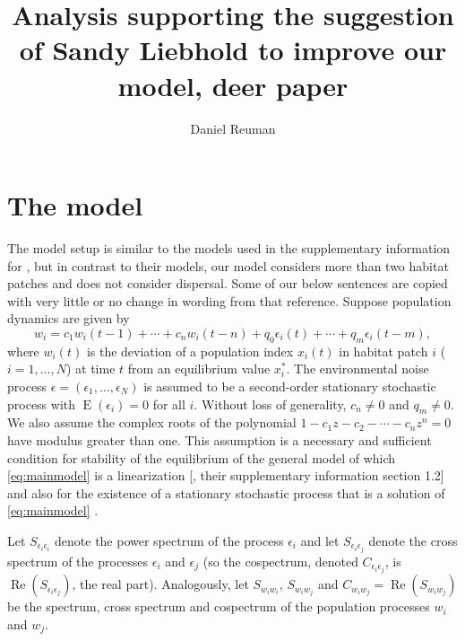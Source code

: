 \documentclass[letterpaper,11pt]{article}
\newcommand{\E}{{\operatorname{E}}}
\newcommand{\Rp}{{\operatorname{Re}}}
\begin{document}
\title{Analysis supporting the suggestion of Sandy Liebhold to improve our model, deer paper}
\author{Daniel Reuman}
\maketitle

\section{The model}\label{sec:model}

The model setup is similar to the models used in the supplementary information for 
\cite{Desharnais2018}, but in
contrast to their models, our model
considers more than two habitat patches and does not consider dispersal.
Some of our below sentences are copied with very little or no change in wording
from that reference.
Suppose population dynamics are given by
\begin{equation}
w_{i} = c_1 w_i(t-1)+ \cdots + c_n w_i(t-n)+q_0 \epsilon_{i}(t)+\cdots+q_{m}\epsilon_{i}(t-m),\label{eq:mainmodel}
\end{equation}
where $w_{i}(t)$ is the deviation of a population index $x_{i}(t)$ in
habitat patch $i$ ($i=1,\ldots,N$) at time $t$ from an equilibrium value $x_{i}^{*}$. 
The environmental noise process $\epsilon=(\epsilon_{1},\ldots,\epsilon_{N})$
is assumed to be a second-order stationary stochastic process with $\E(\epsilon_{i})=0$
for all $i$. Without loss of generality, $c_n \neq 0$ and $q_m \neq 0$. We also assume
the complex roots of the polynomial $1-c_1 z - c_2 - \cdots - c_n z^n=0$
have modulus greater than one. This assumption is a necessary and sufficient condition 
for stability of the equilibrium of the general model of which \ref{eq:mainmodel}
is a linearization [\citealp{Desharnais2018}, their supplementary information section 1.2] and also for the existence of a stationary
stochastic process that is a solution of \ref{eq:mainmodel} \citep{Desharnais2018,Brillinger2011}. 

Let $S_{\epsilon_{i}\epsilon_{i}}$
denote the power spectrum of the process $\epsilon_{i}$ and let $S_{\epsilon_{i}\epsilon_{j}}$
denote the cross spectrum of the processes $\epsilon_{i}$ and $\epsilon_{j}$
(so the cospectrum, denoted $C_{\epsilon_{i}\epsilon_{j}}$, is $\Rp(S_{\epsilon_{i}\epsilon_{j}})$, the real part). Analogously, let $S_{w_i w_i}$,
$S_{w_i w_j}$ and $C_{w_i w_j}=\Rp(S_{w_i w_j})$ be the spectrum, cross spectrum
and cospectrum of the population processes $w_i$ and $w_j$.
\end{document}
